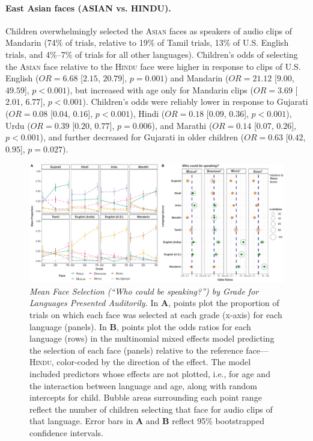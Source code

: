 \documentclass{foushee-adapted-preprint}
\begin{document}
\paragraph{East Asian faces {(A{\small{SIAN}} vs. H{\small{INDU}})}.}
Children overwhelmingly selected the \textsc{Asian} faces as speakers of audio clips of Mandarin (74\% of trials, relative to 19\% of Tamil trials, 13\% of U.S. English trials, and 4\%--7\% of trials for all other languages). 
Children's odds of selecting the \textsc{Asian} face relative to the \textsc{Hindu} face were higher in response to clips of U.S. English ($OR=6.68$ [$2.15$, $20.79$], $p=0.001$) and Mandarin ($OR=21.12$ [$9.00$, $49.59$], $p<0.001$), but increased with age only for Mandarin clips ($OR=3.69$ [$2.01$, $6.77$], $p<0.001$). Children's odds were reliably lower in response to Gujarati ($OR=0.08$ [$0.04$, $0.16$], $p<0.001$), Hindi ($OR=0.18$ [$0.09$, $0.36$], $p<0.001$), Urdu ($OR=0.39$ [$0.20$, $0.77$], $p=0.006$), and Marathi ($OR=0.14$ [$0.07$, $0.26$], $p<0.001$), and further decreased for Gujarati in older children ($OR=0.63$ [$0.42$, $0.95$], $p=0.027$). 

\begin{figure}
    \centering
    \includegraphics[width=\linewidth]{figures/combined_plots/combined_faces_audio_finalized.pdf}
    \caption{\textit{Mean Face Selection (``Who could be speaking?'') by Grade for Languages Presented Auditorily.} In \textbf{A}, points plot the proportion of trials on which each face was selected at each grade (x-axis) for each language (panels). 
    In \textbf{B}, points plot the odds ratios for each language (rows) in the multinomial mixed effects model predicting the selection of each face (panels) relative to the reference face---\textsc{Hindu}, color-coded by the direction of the effect. 
    The model included predictors whose effects are not plotted, i.e., for age and the interaction between language and age, along with random intercepts for child. 
    Bubble areas surrounding each point range reflect the number of children selecting that face for audio clips of that language.
    Error bars in \textbf{A} and \textbf{B} reflect 95\% bootstrapped confidence intervals.
    \label{fig:faces-language-audio}}
\end{figure}
\end{document}
